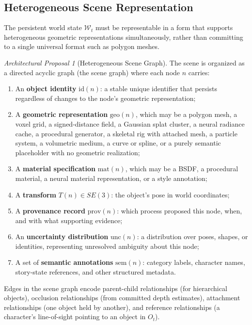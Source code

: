 \documentclass[11pt,a4paper]{article}
\theoremstyle{plain}
\theoremstyle{definition}
\theoremstyle{remark}
\newtheorem{proposal}[theorem]{Architectural Proposal}
\begin{document}
\subsection{Heterogeneous Scene Representation}

The persistent world state $\mathcal{W}_t$ must be representable in a form that supports heterogeneous geometric representations simultaneously, rather than committing to a single universal format such as polygon meshes.

\begin{proposal}[Heterogeneous Scene Graph]
The scene is organized as a directed acyclic graph (the scene graph) where each node $n$ carries:
\begin{enumerate}[leftmargin=2em,itemsep=0pt]
\item An \textbf{object identity} $\mathrm{id}(n)$: a stable unique identifier that persists regardless of changes to the node's geometric representation;
\item A \textbf{geometric representation} $\mathrm{geo}(n)$, which may be a polygon mesh, a voxel grid, a signed-distance field, a Gaussian splat cluster, a neural radiance cache, a procedural generator, a skeletal rig with attached mesh, a particle system, a volumetric medium, a curve or spline, or a purely semantic placeholder with no geometric realization;
\item A \textbf{material specification} $\mathrm{mat}(n)$, which may be a BSDF, a procedural material, a neural material representation, or a style annotation;
\item A \textbf{transform} $T(n) \in SE(3)$: the object's pose in world coordinates;
\item A \textbf{provenance record} $\mathrm{prov}(n)$: which process proposed this node, when, and with what supporting evidence;
\item An \textbf{uncertainty distribution} $\mathrm{unc}(n)$: a distribution over poses, shapes, or identities, representing unresolved ambiguity about this node;
\item A set of \textbf{semantic annotations} $\mathrm{sem}(n)$: category labels, character names, story-state references, and other structured metadata.
\end{enumerate}
Edges in the scene graph encode parent-child relationships (for hierarchical objects), occlusion relationships (from committed depth estimates), attachment relationships (one object held by another), and reference relationships (a character's line-of-sight pointing to an object in $O_t$).
\end{proposal}
\end{document}
